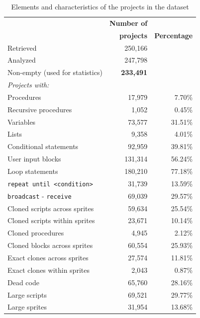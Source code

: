 \documentclass{sig-alternate}
\begin{document}
\begin{table}[ht]
	\centering
	\begin{tabular}{lrr}
		\hline
		&\textbf{Number of}&\\
		&\textbf{projects}& \textbf{Percentage}\\
		\hline
		Retrieved & 250,166 & \\
		Analyzed & 247,798 & \\
		Non-empty (used for statistics) & \textbf{233,491} & \\

		\textit{Projects with:} & & \\
		\hline
		Procedures & 17,979 & 7.70\%\\
		Recursive procedures &  1,052 & 0.45\%\\
		Variables & 73,577 & 31.51\% \\
		Lists & 9,358 & 4.01\% \\
		Conditional statements & 92,959 & 39.81\% \\
		User input blocks& 131,314 & 56.24\% \\
		Loop statements & 180,210 & 77.18\% \\
		\texttt{repeat until <condition>} & 31,739 & 13.59\% \\
		\texttt{broadcast} - \texttt{receive} & 69,039 & 29.57\%\\
		Cloned scripts across sprites & 59,634 & 25.54\% \\
		Cloned scripts within sprites & 23,671 & 10.14\%\\
		Cloned procedures & 4,945 & 2.12\%\\
		Cloned blocks across sprites & 60,554 & 25.93\%\\
		Exact clones across sprites & 27,574 & 11.81\%\\
		Exact clones within sprites & 2,043 & 0.87\%\\
		Dead code & 65,760 & 28.16\%\\
		Large scripts & 69,521 & 29.77\%\\
		Large sprites & 31,954 & 13.68\%\\		
		\hline
	\end{tabular}
	\caption{Elements and characteristics of the projects in the dataset}
	\label{tbl-characteristics}
\end{table}
\end{document}

